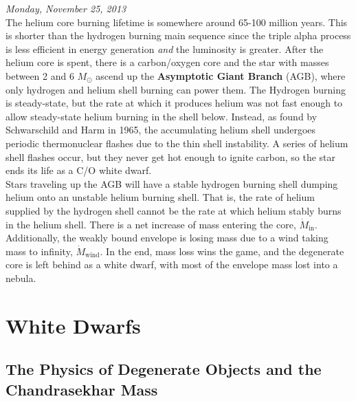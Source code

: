 \documentclass[10pt]{article}
\numberwithin{equation}{section}
\newcommand{\n}{\noindent}
\begin{document}
    \n\textit{Monday, November 25, 2013}\\


    \n The helium core burning lifetime is somewhere around 65-100
    million years. This is shorter than the hydrogen burning main
    sequence since the triple alpha process is less efficient in
    energy generation \emph{and} the luminosity is greater. After the
    helium core is spent, there is a carbon/oxygen core and the star
    with masses between 2 and 6 $M_\odot$ ascend up the
    \textbf{Asymptotic Giant Branch} (AGB), where only hydrogen and helium
    shell burning can power them. The Hydrogen burning is steady-state, but the
    rate at which it produces helium was not fast enough to allow steady-state
    helium burning in the shell below. Instead, as found by Schwarschild and
    Harm in 1965, the accumulating helium shell undergoes periodic
    thermonuclear flashes due to the thin shell instability. A series of helium
    shell flashes occur, but they never get hot enough to ignite carbon, so the
    star ends its life as a C/O white dwarf.\\

    \n Stars traveling up the AGB will have a stable hydrogen burning
    shell dumping helium onto an unstable helium burning shell. That
    is, the rate of helium supplied by the hydrogen shell cannot be
    the rate at which helium stably burns in the helium shell. There
    is a net increase of mass entering the core,
    $\dot{M}_{\mathrm{in}}$. Additionally, the weakly bound envelope
    is losing mass due to a wind taking mass to infinity,
    $\dot{M}_{\mathrm{wind}}$. In the end, mass loss wins the game,
    and the degenerate core is left behind as a white dwarf, with most
    of the envelope mass lost into a nebula.\\

    \section{White Dwarfs}
    \label{sec:endp-stell-evol}

    \subsection{The Physics of Degenerate Objects and the
      Chandrasekhar Mass}
    \label{sec:white-dwarf-cooling}
\end{document}
